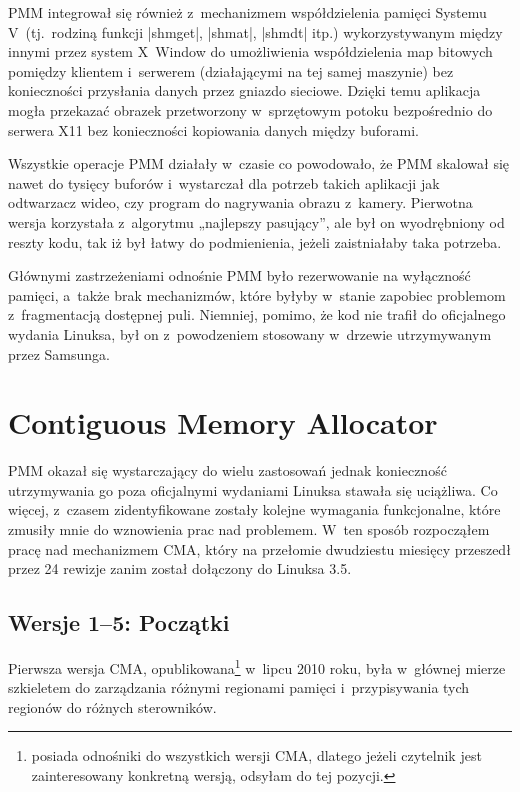 PMM integrował się również z~mechanizmem współdzielenia pamięci
Systemu V~(tj.\ rodziną funkcji \code|shmget|, \code|shmat|,
\code|shmdt| itp.) wykorzystywanym między innymi przez system X~Window
do umożliwienia współdzielenia map bitowych pomiędzy klientem
i~serwerem (działającymi na tej samej maszynie) bez konieczności
przysłania danych przez gniazdo sieciowe.  Dzięki temu aplikacja mogła
przekazać obrazek przetworzony w~sprzętowym potoku bezpośrednio do
serwera X11 bez konieczności kopiowania danych między buforami.

Wszystkie operacje PMM działały w~czasie  co powodowało,
że PMM skalował się nawet do tysięcy buforów i~wystarczał dla potrzeb
takich aplikacji jak odtwarzacz wideo, czy program do nagrywania
obrazu z~kamery.  Pierwotna wersja korzystała z~algorytmu „najlepszy
pasujący”, ale był on wyodrębniony od reszty kodu, tak iż był łatwy do
podmienienia, jeżeli zaistniałaby taka potrzeba.

Głównymi zastrzeżeniami odnośnie PMM było rezerwowanie na wyłączność
pamięci, a~także brak mechanizmów, które byłyby w~stanie zapobiec
problemom z~fragmentacją dostępnej puli.  Niemniej, pomimo, że kod nie
trafił do oficjalnego wydania Linuksa, był on z~powodzeniem stosowany
w~drzewie utrzymywanym przez Samsunga.


\section{Contiguous Memory Allocator}

PMM okazał się wystarczający do wielu zastosowań jednak konieczność
utrzymywania go poza oficjalnymi wydaniami Linuksa stawała się
uciążliwa.  Co więcej, z~czasem zidentyfikowane zostały kolejne
wymagania funkcjonalne, które zmusiły mnie do wznowienia prac nad
problemem.  W~ten sposób rozpocząłem pracę nad mechanizmem CMA, który
na przełomie dwudziestu miesięcy przeszedł przez 24 rewizje zanim
został dołączony do Linuksa 3.5.

\subsection{Wersje 1--5: Początki}\label{sec:evo-cma}

Pierwsza wersja CMA, opublikowana\footnote{\autocite{patch:cma-24}
  posiada odnośniki do wszystkich wersji CMA, dlatego jeżeli czytelnik
  jest zainteresowany konkretną wersją, odsyłam do tej pozycji.}
w~lipcu 2010 roku, była w~głównej mierze szkieletem do zarządzania
różnymi regionami pamięci i~przypisywania tych regionów do różnych
sterowników.

